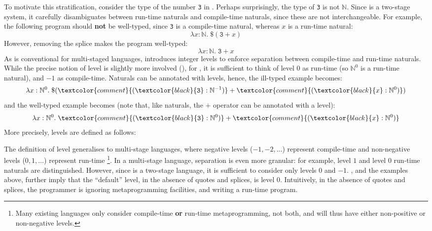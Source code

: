   To motivate this stratification, consider the type of the number \texttt{3} in \sourceLang{}. Perhaps surprisingly, the type of \texttt{3} is not $\mathbb{N}$. Since \sourceLang{} is a two-stage system, it carefully disambiguates between run-time naturals and compile-time naturals, since these are not interchangeable. For example, the following program should \textbf{not} be well-typed, since \texttt{3} is a compile-time natural, whereas $x$ is a run-time natural: 
  \[\lambda x: \mathbb{N}. \; \$(\texttt{3} + x)\]
  However, removing the splice makes the program well-typed:
  \[\lambda x: \mathbb{N}. \; \texttt{3} + x\]
  As is conventional for multi-staged languages, \sourceLang{} introduces integer levels to enforce separation between compile-time and run-time naturals. While the precise notion of level is slightly more involved (), for \sourceLang{}, it is sufficient to think of level $0$ as run-time (so $\mathbb{N}^0$ is a run-time natural), and $-1$ as compile-time. Naturals can be annotated with levels, hence, the ill-typed example becomes:
  \[\lambda x: \mathbb{N}^0. \; \$(\textcolor{comment}{(\textcolor{black}{\texttt{3}}:\mathbb{N}^{-1})} + \textcolor{comment}{(\textcolor{black}{x}:\mathbb{N}^{0})})\]
  and the well-typed example becomes (note that, like naturals, the $+$ operator can be annotated with a level): 
  \[\lambda x: \mathbb{N}^0. \; \textcolor{comment}{(\textcolor{black}{\texttt{3}}:\mathbb{N}^{0})} + \textcolor{comment}{(\textcolor{black}{x}:\mathbb{N}^{0})}\]
  More precisely, levels are defined as follows:


  The definition of level generalises to multi-stage languages, where negative levels ($-1, -2, \ldots$) represent compile-time and non-negative levels ($0, 1, \ldots$) represent run-time \footnote{Many existing languages only consider compile-time \textbf{or} run-time metaprogramming, not both, and will thus have either non-positive or non-negative levels.}. In a multi-stage language, separation is even more granular: for example, level $1$ and level $0$ run-time naturals are distinguished. However, since \sourceLang{} is a two-stage language, it is sufficient to consider only levels $0$ and $-1$. , and the examples above, further imply that the ``default'' level, in the absence of quotes and splices, is level $0$. Intuitively, in the absence of quotes and splices, the programmer is ignoring metaprogramming facilities, and writing a run-time program. 


